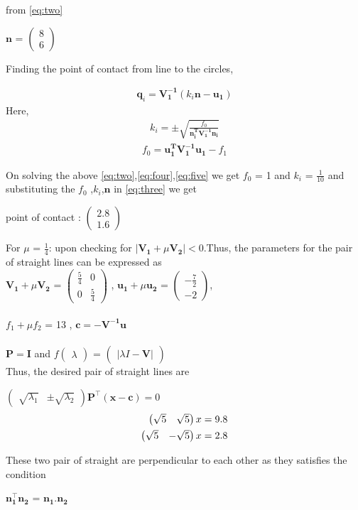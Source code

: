 \documentclass[journal,12pt,twocolumn]{IEEEtran}
\newcommand{\myvec}[1]{\ensuremath{\begin{pmatrix}#1\end{pmatrix}}}
\let\vec\mathbf
\begin{document}
from \eqref{eq:two}
\begin{center}
$\vec{n}$ = $\myvec{8 \\ 6}$ 
\end{center}	 
Finding the point of contact from line to the circles,

\begin{align}
\label{eq:three}
\boxed{\vec{q}_i = \vec{V_1^{-1}}(k_i\vec{n-u_1})} 
\end{align}
Here, 
\begin{align}
\label{eq:four}
k_i = \pm\sqrt{\frac{f_0}{\vec{n_i^TV_1^{-1}n_i}}}
\end{align}
\begin{align}
\label{eq:five}
f_0 = \vec{u_1^TV_1^{-1}u_1}-f_1
\end{align}

On solving the above \eqref{eq:two},\eqref{eq:four},\eqref{eq:five} we get $f_0$ = 1 and $k_i$ = $\frac{1}{10}$ and substituting the $f_0$ ,$k_i$,$\vec{n}$ in \eqref{eq:three} we get 
\begin{center}
point of contact : $\myvec{2.8 \\ 1.6}$
\end{center}

For $\mu$ = $\frac{1}{4}$: 
upon checking for $|\vec{V_1}+\mu\vec{V_2}|<0$.Thus, the parameters for the pair of straight lines can be expressed as \\
$\vec{V_1}+\mu\vec{V_2}$ = $\myvec{\frac{5}{4} & 0 \\ 0 & \frac{5}{4}}$ ,
$\vec{u_1}+\mu\vec{u_2}$ = $\myvec{-\frac{7}{2} \\ -2}$,\\ 
\\${f_1+\mu f_2}$ = 13 ,
$\vec{c} = \vec{-V^{-1}u}$ \\
\\$\vec{P} = \vec{I}$ and
$f\myvec{\lambda}$ = $\myvec{|\lambda I - \vec{V}|}$ \\
Thus, the desired pair of straight lines are 
\begin{center}
$\myvec{\sqrt{\lambda_1} & \pm \sqrt{\lambda_2}}\vec{P}^{\top} \vec{(x-c)}=0$ 
\begin{align}
\label{eq:six}
\myvec{\sqrt{5} & \sqrt{5}}x = 9.8 \\
\label{eq:seven}
\vspace{0.5cm}\myvec{\sqrt{5} & -\sqrt{5}}x = 2.8
\end{align}
\end{center}

These two pair of straight are perpendicular to each other as they satisfies the condition
\begin{center}
$\vec{n_1^{\top} n_2}$ = $\vec{n_1.n_2}$ \\
\end{center}
\end{document}
